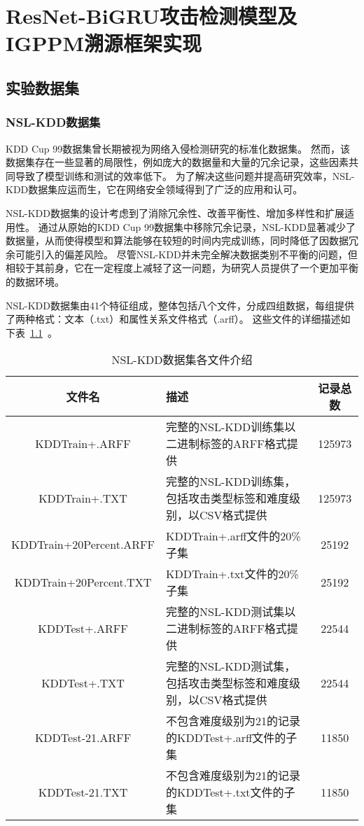 \chapter{ResNet-BiGRU攻击检测模型及IGPPM溯源框架实现}
\label{cha:ResNet-BiGRU-IGPPM}

\section{实验数据集}

\subsection{NSL-KDD数据集\cite{revathi2013detailed}}
KDD Cup 99数据集\cite{tavallaee2009detailed}曾长期被视为网络入侵检测研究的标准化数据集。
然而，该数据集存在一些显著的局限性，例如庞大的数据量和大量的冗余记录，这些因素共同导致了模型训练和测试的效率低下。
为了解决这些问题并提高研究效率，NSL-KDD数据集应运而生，它在网络安全领域得到了广泛的应用和认可。


NSL-KDD数据集的设计考虑到了消除冗余性、改善平衡性、增加多样性和扩展适用性。
通过从原始的KDD Cup 99数据集中移除冗余记录，NSL-KDD显著减少了数据量，从而使得模型和算法能够在较短的时间内完成训练，同时降低了因数据冗余可能引入的偏差风险。
尽管NSL-KDD并未完全解决数据类别不平衡的问题，但相较于其前身，它在一定程度上减轻了这一问题，为研究人员提供了一个更加平衡的数据环境。


NSL-KDD数据集由41个特征组成，整体包括八个文件，分成四组数据，每组提供了两种格式：文本（.txt）和属性关系文件格式（.arff）。
这些文件的详细描述如下表~\ref{tab:NSLKDDFile}~。
\begin{table}[htbp]
  \caption{NSL-KDD数据集各文件介绍}
  \label{tab:NSLKDDFile}
  \begin{tabularx}{\textwidth}{cXc}
    \toprule
    \textbf{文件名} & \textbf{描述} & \textbf{记录总数}\\
  \midrule
    KDDTrain+.ARFF & 完整的NSL-KDD训练集以二进制标签的ARFF格式提供 &125973\\
    KDDTrain+.TXT & 完整的NSL-KDD训练集，包括攻击类型标签和难度级别，以CSV格式提供&125973\\
    KDDTrain+20Percent.ARFF & KDDTrain+.arff文件的20\%子集&25192\\
    KDDTrain+20Percent.TXT & KDDTrain+.txt文件的20\%子集 &25192\\
    KDDTest+.ARFF & 完整的NSL-KDD测试集以二进制标签的ARFF格式提供 &22544\\
    KDDTest+.TXT & 完整的NSL-KDD测试集，包括攻击类型标签和难度级别，以CSV格式提供 & 22544\\
    KDDTest-21.ARFF & 不包含难度级别为21的记录的KDDTest+.arff文件的子集 &11850\\
    KDDTest-21.TXT & 不包含难度级别为21的记录的KDDTest+.txt文件的子集&11850 \\
  \bottomrule
  \end{tabularx}
\end{table}

